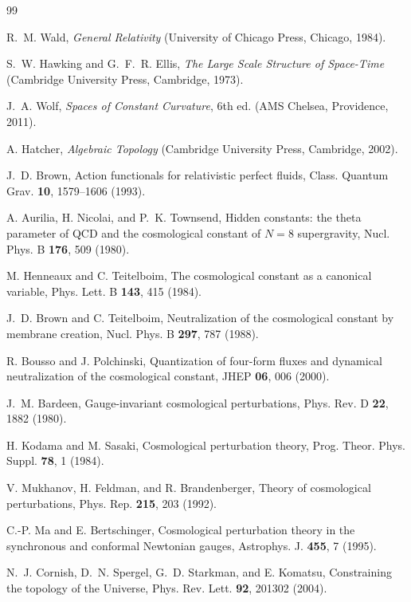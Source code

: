 \documentclass[
  aps,
  prd,
  reprint,
  superscriptaddress,
  floatfix,
  nofootinbib,
  longbibliography
]{revtex4-2}
\theoremstyle{plain}
\theoremstyle{definition}
\theoremstyle{remark}
\begin{document}
\begin{thebibliography}{99}

R.~M. Wald, \emph{General Relativity} (University of Chicago Press, Chicago, 1984).

S.~W. Hawking and G.~F.~R. Ellis, \emph{The Large Scale Structure of Space-Time}
(Cambridge University Press, Cambridge, 1973).

J.~A. Wolf, \emph{Spaces of Constant Curvature}, 6th ed. (AMS Chelsea,
Providence, 2011).

A. Hatcher, \emph{Algebraic Topology} (Cambridge University Press, Cambridge, 2002).

J.~D. Brown, Action functionals for relativistic perfect fluids,
Class. Quantum Grav. \textbf{10}, 1579--1606 (1993).


A. Aurilia, H. Nicolai, and P.~K. Townsend,
Hidden constants: the theta parameter of QCD and the cosmological constant of
\(N=8\) supergravity, Nucl. Phys. B \textbf{176}, 509 (1980).

M. Henneaux and C. Teitelboim,
The cosmological constant as a canonical variable,
Phys. Lett. B \textbf{143}, 415 (1984).

J.~D. Brown and C. Teitelboim,
Neutralization of the cosmological constant by membrane creation,
Nucl. Phys. B \textbf{297}, 787 (1988).

R. Bousso and J. Polchinski,
Quantization of four-form fluxes and dynamical neutralization of the cosmological constant,
JHEP \textbf{06}, 006 (2000).

J.~M. Bardeen, Gauge-invariant cosmological perturbations,
Phys. Rev. D \textbf{22}, 1882 (1980).

H. Kodama and M. Sasaki, Cosmological perturbation theory,
Prog. Theor. Phys. Suppl. \textbf{78}, 1 (1984).

V. Mukhanov, H. Feldman, and R. Brandenberger,
Theory of cosmological perturbations,
Phys. Rep. \textbf{215}, 203 (1992).

C.-P. Ma and E. Bertschinger,
Cosmological perturbation theory in the synchronous and conformal Newtonian gauges,
Astrophys. J. \textbf{455}, 7 (1995).

N.~J. Cornish, D.~N. Spergel, G.~D. Starkman, and E. Komatsu,
Constraining the topology of the Universe,
Phys. Rev. Lett. \textbf{92}, 201302 (2004).


\end{thebibliography}
\end{document}
